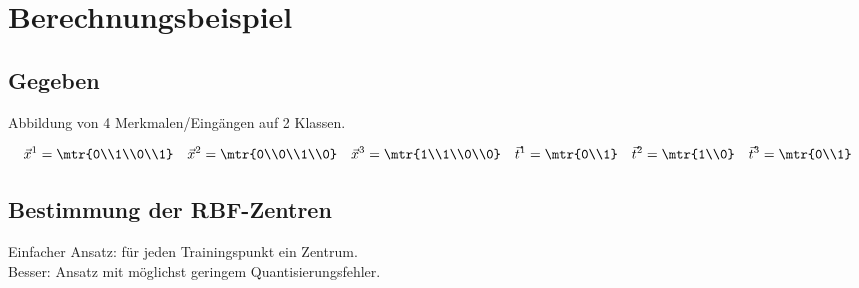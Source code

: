 \section{Berechnungsbeispiel}
\subsection{Gegeben}
Abbildung von 4 Merkmalen/Eingängen auf 2 Klassen.
\begin{center}
\end{center}
$$\vec{x}^1=\mtr{0\\1\\0\\1} \quad \vec{x}^2=\mtr{0\\0\\1\\0} \quad \vec{x}^3=\mtr{1\\1\\0\\0}\quad \vec{t}^1=\mtr{0\\1} \quad \vec{t}^2 =\mtr{1\\0} \quad \vec{t}^3=\mtr{0\\1}$$
\subsection{Bestimmung der RBF-Zentren}
Einfacher Ansatz: für jeden Trainingspunkt ein Zentrum.\\
Besser: Ansatz mit möglichst geringem Quantisierungsfehler.
